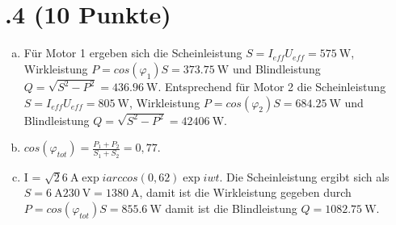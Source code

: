 \section*{\nr.4 \titfour (10 Punkte)}
\begin{enumerate}[(a)]
\item Für Motor 1 ergeben sich die Scheinleistung $S = I_{eff}U_{eff} = \SI{575}{\watt}$, Wirkleistung $P = cos(\varphi_1) S =\SI{373,75}{\watt}$ und Blindleistung $Q = \sqrt{S^2 - P^2} = \SI{436,96}{\watt}$.
Entsprechend für Motor 2 die Scheinleistung $S = I_{eff}U_{eff} = \SI{805}{\watt}$, Wirkleistung $P = cos(\varphi_2) S =\SI{684,25}{\watt}$ und Blindleistung $Q = \sqrt{S^2 - P^2} = \SI{42406}{\watt}$.
\item $cos(\varphi_{tot}) =\frac{P_1 + P_2}{S_1 + S_2} = 0,77$.
\item I = $\sqrt{2}\SI{6}{\ampere}\exp{iarccos(0,62)} \exp{iwt}$.
Die Scheinleistung ergibt sich als $S =\SI{6}{\ampere}\SI{230}{\volt} = \SI{1380}{\ampere}$, damit ist die Wirkleistung gegeben durch $P = cos(\varphi_{tot})S = \SI{855,6}{\watt}$ damit ist die Blindleistung $Q = \SI{1082,75}{\watt}$.
\end{enumerate}
